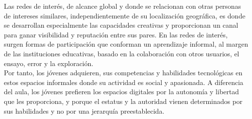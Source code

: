 Las redes de interés, de alcance global y donde se relacionan con otras personas de intereses similares, independientemente de su localización geográfica, es donde se desarrollan especialmente las capacidades creativas y proporcionan un canal para ganar visibilidad y reputación entre sus pares. En las redes de interés, surgen formas de participación que conforman un aprendizaje informal, al margen de las instituciones educativas, basado en la colaboración con otros usuarios, el ensayo, error y la exploración.
\\[1pt]

Por tanto, los jóvenes adquieren, sus competencias y habilidades tecnológicas en estos espacios informales donde su actividad es social y apasionada. A diferencia del aula, los jóvenes prefieren los espacios digitales por la autonomía y libertad que les proporciona, y porque el estatus y la autoridad vienen determinados por sus habilidades y no por una jerarquía preestablecida\cite{vid09}.
\\[1pt]


